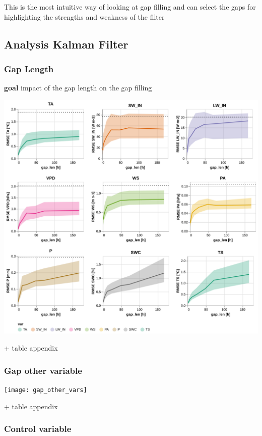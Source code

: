 \documentclass{article}
\let\Oldsubsection\subsection
\renewcommand{\subsection}{\FloatBarrier\Oldsubsection}
\let\Oldsubsubsection\subsubsection
\renewcommand{\subsubsection}{\FloatBarrier\Oldsubsubsection}
\begin{document}
This is the most intuitive way of looking at gap filling and can select the gaps for highlighting the strengths and weakness of the filter


\subsection{Analysis Kalman Filter}

\subsubsection{Gap Length}

\textbf{goal} impact of the gap length on the gap filling

\includegraphics[width=\textwidth]{gap_len}

+ table appendix

\subsubsection{Gap other variable}

\texttt{[image: gap\_other\_vars]}

+ table appendix

\subsubsection{Control variable}
\end{document}
